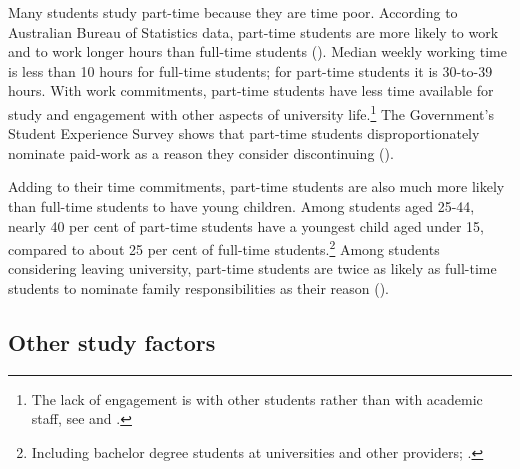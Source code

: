 Many students study part-time because they are time poor. According to Australian Bureau of Statistics data, part-time students are more likely to work and to work longer hours than full-time students (). Median weekly working time is less than 10 hours for full-time students; for part-time students it is 30-to-39 hours. With work commitments, part-time students have less time available for study and engagement with other aspects of university life.\footnote{The lack of engagement is with other students rather than with academic staff, see  and \textcite[][section~2.1]{Cherastidtham2018a}.} The Government's Student Experience Survey shows that part-time students disproportionately nominate paid-work as a reason they consider discontinuing ().

Adding to their time commitments, part-time students are also much more likely than full-time students to have young children. Among students aged 25-44, nearly 40 per cent of part-time students have a youngest child aged under 15, compared to about 25 per cent of full-time students.\footnote{Including bachelor degree students at universities and other providers; \textcite{ABS2016b}.} Among students considering leaving university, part-time students are twice as likely as full-time students to nominate family responsibilities as their reason ().


\subsection{Other study factors}\label{subsec:3.1.3}

